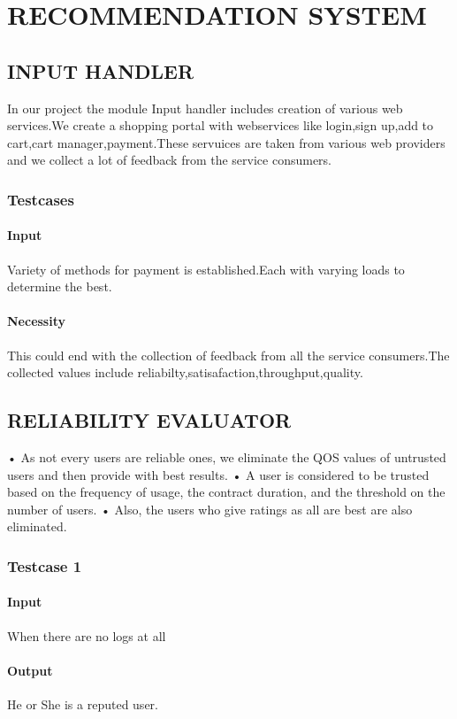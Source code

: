 \chapter{RECOMMENDATION SYSTEM}
\section{INPUT HANDLER}
In our project the module Input handler includes creation of various web services.We create a shopping portal with webservices like login,sign up,add to cart,cart manager,payment.These servuices are taken from various web providers and we collect a lot of feedback from the service consumers.
\subsection{Testcases}
\subsubsection{Input}
    Variety of methods for payment is established.Each with varying loads to determine the best.
\subsubsection{Necessity}
     This could end with the collection of feedback from all the service consumers.The collected values include reliabilty,satisafaction,throughput,quality.
\newpage
\section{RELIABILITY EVALUATOR}
•	As not every users are reliable ones, we eliminate the QOS values of untrusted users and then provide with best results.
•	A user is considered to be trusted based on the frequency of usage, the contract duration, and the threshold on the number of users. 
•	Also, the users who give ratings as all are best are also eliminated.
\subsection{Testcase 1}
\subsubsection{Input}
When there are no logs at all
\subsubsection{Output}
He or She is a reputed user.
